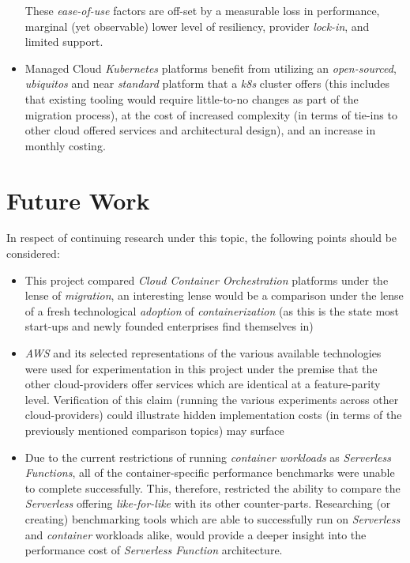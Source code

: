 \begin{itemize}
            These \emph{ease-of-use} factors are off-set by a measurable loss in performance, marginal (yet observable) lower level of resiliency, provider \textit{lock-in},
            and limited support.
      \item Managed Cloud \textit{Kubernetes} platforms benefit from utilizing an \textit{open-sourced}, \emph{ubiquitos} and near \textit{standard} platform
            that a \textit{k8s} cluster offers (this includes that existing tooling would require little-to-no changes as part of the migration process),
            at the cost of increased complexity (in terms of tie-ins to other cloud offered services and architectural design),
            and an increase in monthly costing.
\end{itemize}

\chapter{Future Work}
In respect of continuing research under this topic, the following points should be considered:
\begin{itemize}
      \item This project compared \emph{Cloud Container Orchestration} platforms under the lense of \emph{migration},
            an interesting lense would be a comparison under the lense of a fresh technological \emph{adoption} of \textit{containerization}
            (as this is the state most start-ups and newly founded enterprises find themselves in)
      \item \textit{AWS} and its selected representations of the various available technologies were used for experimentation in this project
            under the premise that the other cloud-providers offer services which are identical at a feature-parity level.
            Verification of this claim (running the various experiments across other cloud-providers) could illustrate hidden implementation costs
            (in terms of the previously mentioned comparison topics) may surface
      \item Due to the current restrictions of running \textit{container workloads} as \textit{Serverless Functions},
            all of the container-specific performance benchmarks were unable to complete successfully.
            This, therefore, restricted the ability to compare the \textit{Serverless} offering \emph{like-for-like} with its other counter-parts.
            Researching (or creating) benchmarking tools which are able to successfully run on \textit{Serverless} and \textit{container} workloads alike,
            would provide a deeper insight into the performance cost of \textit{Serverless Function} architecture.
\end{itemize}
